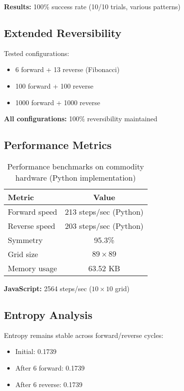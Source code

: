 \documentclass[11pt]{article}
\begin{document}
\textbf{Results:} 100\% success rate (10/10 trials, various patterns)

\subsection{Extended Reversibility}

Tested configurations:
\begin{itemize}
\item 6 forward + 13 reverse (Fibonacci)
\item 100 forward + 100 reverse
\item 1000 forward + 1000 reverse
\end{itemize}

\textbf{All configurations:} 100\% reversibility maintained

\subsection{Performance Metrics}

\begin{table}[h]
\centering
\begin{tabular}{|l|c|}
\hline
\textbf{Metric} & \textbf{Value} \\
\hline
Forward speed & 213 steps/sec (Python) \\
Reverse speed & 203 steps/sec (Python) \\
Symmetry & 95.3\% \\
Grid size & $89\times89$ \\
Memory usage & 63.52 KB \\
\hline
\end{tabular}
\caption{Performance benchmarks on commodity hardware (Python implementation)}
\end{table}

\textbf{JavaScript:} 2564 steps/sec ($10\times10$ grid)

\subsection{Entropy Analysis}

Entropy remains stable across forward/reverse cycles:
\begin{itemize}
\item Initial: 0.1739
\item After 6 forward: 0.1739
\item After 6 reverse: 0.1739
\end{itemize}
\end{document}
